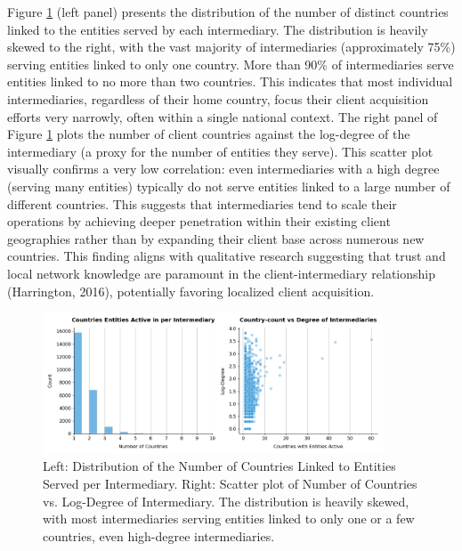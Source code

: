 Figure \ref{fig:geography_distribution_countries_by_intermediary} (left panel) presents the distribution of the number of distinct countries linked to the entities served by each intermediary. The distribution is heavily skewed to the right, with the vast majority of intermediaries (approximately 75\%) serving entities linked to only one country. More than 90\% of intermediaries serve entities linked to no more than two countries. This indicates that most individual intermediaries, regardless of their home country, focus their client acquisition efforts very narrowly, often within a single national context. The right panel of Figure \ref{fig:geography_distribution_countries_by_intermediary} plots the number of client countries against the log-degree of the intermediary (a proxy for the number of entities they serve). This scatter plot visually confirms a very low correlation: even intermediaries with a high degree (serving many entities) typically do not serve entities linked to a large number of different countries. This suggests that intermediaries tend to scale their operations by achieving deeper penetration within their existing client geographies rather than by expanding their client base across numerous new countries. This finding aligns with qualitative research suggesting that trust and local network knowledge are paramount in the client-intermediary relationship (Harrington, 2016), potentially favoring localized client acquisition.

\begin{figure}[htbp]
    \centering
    \includegraphics[width=0.9\textwidth]{images/Geography_Distribution_of_Countries_by_Intermediary.png} %
    \caption{Left: Distribution of the Number of Countries Linked to Entities Served per Intermediary. Right: Scatter plot of Number of Countries vs. Log-Degree of Intermediary. The distribution is heavily skewed, with most intermediaries serving entities linked to only one or a few countries, even high-degree intermediaries.}
    \label{fig:geography_distribution_countries_by_intermediary}
\end{figure}

